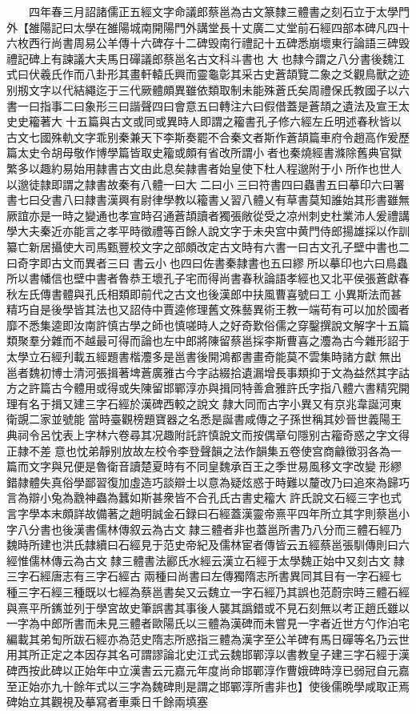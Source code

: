 　　四年春三月詔諸儒正五經文字命議郎蔡邕為古文篆隸三體書之刻石立于太學門外【雒陽記曰太學在雒陽城南開陽門外講堂長十丈廣二丈堂前石經四部本碑凡四十六枚西行尚書周易公羊傳十六碑存十二碑毁南行禮記十五碑悉崩壞東行論語三碑毁禮記碑上有諫議大夫馬日磾議郎蔡邕名古文科斗書也大也隸今謂之八分書後魏江式曰伏羲氏作而八卦形其畫軒轅氏興而靈龜彰其采古史蒼頡覽二象之爻觀鳥獸之迹别剏文字以代結繩迄于三代厥體頗異雖依類取制未能殊蒼氏矣周禮保氏教國子以六書一曰指事二曰象形三曰諧聲四曰會意五曰轉注六曰假借蓋是蒼頡之遺法及宣王太史史籕著大十五篇與古文或同或異時人即謂之籕書孔子修六經左丘明述春秋皆以古文七國殊軌文字乖别秦兼天下李斯奏罷不合秦文者斯作蒼頡篇車府令趙高作爰歷篇太史令胡母敬作博學篇皆取史籕或頗有省改所謂小者也秦燒經書滌除舊典官獄繁多以趣約易始用隷書古文由此息矣隷書者始皇使下杜人程邈附于小所作也世人以邈徒隷即謂之隷書故秦有八體一曰大二曰小三曰符書四曰蟲書五曰摹印六曰署書七曰殳書八曰隷書漢興有尉律學教以籕書乂習八體乂有草書莫知誰始其形書雖無厥誼亦是一時之變通也孝宣時召通蒼頡讀者獨張敞從受之凉州刺史杜業沛人爰禮講學大夫秦近亦能言之孝平時徵禮等百餘人說文字于未央宫中黄門侍郎揚雄採以作訓纂亡新居攝使大司馬甄豐校文字之部頗改定古文時有六書一曰古文孔子壁中書也二曰奇字即古文而異者三曰書云小也四曰佐書秦隷書也五曰繆所以摹印也六曰鳥蟲所以書幡信也壁中書者魯恭王壞孔子宅而得尚書春秋論語孝經也又北平侯張蒼獻春秋左氏傳書體與孔氏相類即前代之古文也後漢郎中扶風曹喜號曰工小異斯法而甚精巧自是後學皆其法也又詔侍中賈逵修理舊文殊藝異術王教一端苟有可以加於國者靡不悉集逵即汝南許慎古學之師也慎嗟時人之好奇歎俗儒之穿鑿撰說文解字十五篇類聚羣分雜而不越最可得而論也左中郎將陳留蔡邕採李斯曹喜之灋為古今雜形詔于太學立石經刋載五經題書楷灋多是邕書後開鴻都書畫奇能莫不雲集時諸方獻無出邕者魏初博士清河張揖著埤蒼廣雅古今字詁綴拾遺漏增長事類抑于文為益然其字詁方之許篇古今體用或得或失陳留邯鄲淳亦與揖同特善倉雅許氏字指八體六書精究開理有名于揖又建三字石經於漢碑西較之說文隷大同而古字小異又有京兆韋誕河東衛覬二家並號能當時臺觀榜題寶器之名悉是誕書咸傳之子孫世稱其妙晉世義陽王典祠令呂忱表上字林六卷尋其况趣附託許慎說文而按偶章句隱别古籕奇惑之字文得正隷不差意也忱弟靜别放故左校令李登聲韻之法作韻集五卷使宫商龣徵羽各為一篇而文字與兄便是魯衛音讀楚夏時有不同皇魏承百王之季世易風移文字改變形繆錯隷體失真俗學鄙習復加虛造巧談辯士以意為疑炫惑于時難以釐改乃曰追來為歸巧言為辯小兔為䨲神蟲為蠶如斯甚衆皆不合孔氏古書史籕大許氏說文石經三字也式言字學本末頗詳故備著之趙明誠金石録曰石經蓋漢靈帝熹平四年所立其字則蔡邕小字八分書也後漢書儒林傳叙云為古文隷三體者非也蓋邕所書乃八分而三體石經乃魏時所建也洪氏隷續曰石經見于范史帝紀及儒林宦者傳皆云五經蔡邕張馴傳則曰六經惟儒林傳云為古文隸三體書法酈氏水經云漢立石經于太學魏正始中又刻古文隸三字石經唐志有三字石經古兩種曰尚書曰左傳獨隋志所書異同其目有一字石經七種三字石經三種既以七經為蔡邕書矣又云魏立一字石經乃其誤也范蔚宗時三體石經與熹平所䥴並列于學宮故史筆誤書其事後人襲其譌錯或不見石刻無以考正趙氏雖以一字為中郎所書而未見三體者歐陽氏以三體為漢碑而未嘗見一字者近世方勺作泊宅編載其弟匋所跋石經亦為范史隋志所惑指三體為漢字至公羊碑有馬日磾等名乃云世用其所正定之本因存其名可謂謬論北史江式云魏邯鄲淳以書教皇子建三字石經于漢碑西按此碑以正始年中立漢書云元嘉元年度尚命邯鄲淳作曹娥碑時淳已弱冠自元嘉至正始亦九十餘年式以三字為魏碑則是謂之邯鄲淳所書非也】使後儒晩學咸取正焉碑始立其觀視及摹寫者車乘日千餘兩填塞